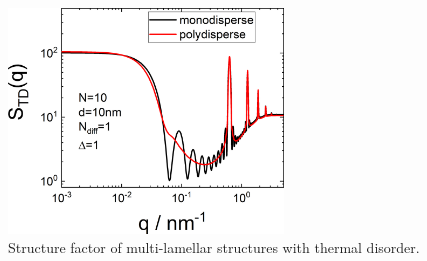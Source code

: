 \begin{figure}[htb]
\begin{center}
\includegraphics[width=0.65\textwidth]{../images/structure_factor/Lamellar/TDLamellar.png}
\end{center}
\caption{Structure factor of multi-lamellar structures with thermal disorder. }
\label{fig:TDLamellar}
\end{figure}

